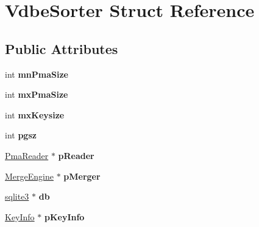 \hypertarget{struct_vdbe_sorter}{}\section{Vdbe\+Sorter Struct Reference}
\label{struct_vdbe_sorter}
\subsection*{Public Attributes}
\begin{DoxyCompactItemize}
\item 
\mbox{\label{struct_vdbe_sorter_a6d201d0f496260f7f2c7f450cae5898b}} 
int {\bfseries mn\+Pma\+Size}
\item 
\mbox{\label{struct_vdbe_sorter_ab23b8039f7b58052b6c6dfc32aa895ed}} 
int {\bfseries mx\+Pma\+Size}
\item 
\mbox{\label{struct_vdbe_sorter_a378f212fc0dc1eb53662fe9651c83e92}} 
int {\bfseries mx\+Keysize}
\item 
\mbox{\label{struct_vdbe_sorter_adf515e49daec945d414c95c5793d8b92}} 
int {\bfseries pgsz}
\item 
\mbox{\label{struct_vdbe_sorter_ae5e5be145520adddd62d221dcdc1aa8e}} 
\mbox{\hyperlink{struct_pma_reader}{Pma\+Reader}} $\ast$ {\bfseries p\+Reader}
\item 
\mbox{\label{struct_vdbe_sorter_a8771886d3d97de93fd786b4ec9f2c185}} 
\mbox{\hyperlink{struct_merge_engine}{Merge\+Engine}} $\ast$ {\bfseries p\+Merger}
\item 
\mbox{\label{struct_vdbe_sorter_a8289109b89d3798362e4edc596c3c887}} 
\mbox{\hyperlink{structsqlite3}{sqlite3}} $\ast$ {\bfseries db}
\item 
\mbox{\label{struct_vdbe_sorter_a97c1a2aefd6dd093e82eddbf1bc9ffde}} 
\mbox{\hyperlink{struct_key_info}{Key\+Info}} $\ast$ {\bfseries p\+Key\+Info}
\item 
\mbox{\label{struct_vdbe_sorter_a0d85cdf1cf25c75cf90394d1bcfd27b9}} 

\end{DoxyCompactItemize}
